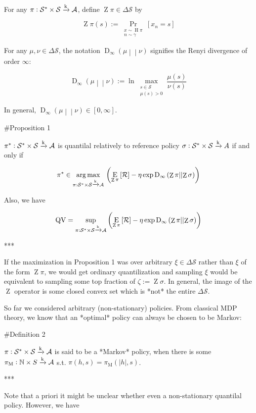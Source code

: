 \documentclass[a4paper]{article}
\newcommand{\Comment}[1]{}
\newcommand{\AP}[1]{\left(#1\right)}
\newcommand{\AB}[1]{\left[#1\right]}
\newcommand{\Pa}[2]{\underset{#1}{\operatorname{Pr}}\AB{#2}}
\newcommand{\Ea}[2]{\underset{#1}{\operatorname{E}}\AB{#2}}
\newcommand{\RD}[3]{\operatorname{D}_{#1}\AP{#2\middle\vert\middle\vert#3}}
\newcommand{\Argmax}[1]{\underset{#1}{\operatorname{arg\,max}}\,}
\newcommand{\Nats}{\mathbb{N}}
\newcommand{\Abs}[1]{\left\vert #1 \right\vert}
\newcommand{\K}{\xrightarrow{\textnormal{k}}}
\newcommand{\A}{\mathcal{A}}
\newcommand{\St}{\mathcal{S}}
\newcommand{\R}{\mathcal{R}}
\newcommand{\QV}{\operatorname{QV}}
\DeclareMathOperator{\Hi}{H}
\DeclareMathOperator{\Z}{Z}
\begin{document}
For any $\pi: \St^*\times\St \K \A$, define $\Z{\pi}\in\Delta\St$ by

$$\Z{\pi}(s):=\Pa{\substack{x\sim\Hi{\pi}\\n\sim\gamma}}{x_n=s}$$

For any $\mu,\nu\in\Delta\St$, the notation $\RD{\infty}{\mu}{\nu}$ signifies the Renyi divergence of order $\infty$:

$$\RD{\infty}{\mu}{\nu} := \ln \max_{\substack{s\in\St \\ \mu(s)> 0}}\frac{\mu(s)}{\nu(s)}$$

In general, $\RD{\infty}{\mu}{\nu} \in [0,\infty]$. 

\#Proposition 1

$\pi^* : \St^*\times\St \K \A$ is quantilal relatively to reference policy $\sigma: \St^*\times\St \K A$ if and only if

$$\pi^* \in \Argmax{\pi: \St^*\times\St \K \A}\AP{\Ea{\Z{\pi}}{\R}-\eta \exp{\RD{\infty}{\Z{\pi}}{\Z{\sigma}}}}$$

Also, we have

$$\QV = \sup_{\pi: \St^*\times\St \K \A}\AP{\Ea{\Z{\pi}}{\R}-\eta \exp{\RD{\infty}{\Z{\pi}}{\Z{\sigma}}}}$$

***

If the maximization in Proposition 1 was over arbitrary $\xi \in \Delta\St$ rather than $\xi$ of the form $\Z{\pi}$, we would get ordinary quantilization and sampling $\xi$ would be equivalent to sampling some top fraction of $\zeta:=\Z{\sigma}$. In general, the image of the $\Z$ operator is some closed convex set which is *not* the entire $\Delta\St$.  \Comment{Also, Proposition 1 shows that quantilality only depends on $\sigma$ via $\zeta$. In the following, we will say that $\pi$ is quantilal relatively to $\zeta\in\Delta\St$ when it satisfies the property given in Proposition 1 with $\Z{\sigma}$ replaced by $\zeta$.}

So far we considered arbitrary (non-stationary) policies. From classical MDP theory, we know that an *optimal* policy can always be chosen to be Markov:

\#Definition 2

$\pi: \St^* \times \St \K \A$ is said to be a *Markov* policy, when there is some $\pi_\text{M}: \Nats \times S \K \A$ s.t. $\pi(h,s)=\pi_\text{M}\AP{\Abs{h},s}$.

***

Note that a priori it might be unclear whether even a non-stationary quantilal policy. However, we have
\end{document}

